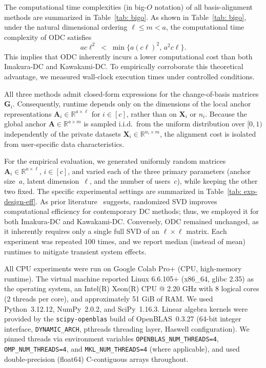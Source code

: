 \documentclass[final,3p,times]{elsarticle}
\theoremstyle{plain}
\newcommand{\matr}[1]{\bm{#1}}        %
\begin{document}
The computational time complexities (in big-\(O\) notation) of all basis-alignment methods are summarized in Table~\ref{tab: bigo}. As shown in Table~\ref{tab: bigo}, under the natural dimensional ordering \(\ell \le m < a\), the computational time complexity of ODC satisfies
\begin{equation}
    a c \ell^{2} \;<\; \min\{a(c\ell)^2,\, a^2 c \ell\}.
\end{equation}
This implies that ODC inherently incurs a lower computational cost than both Imakura-DC and Kawakami-DC. To empirically corroborate this theoretical advantage, we measured wall-clock execution times under controlled conditions.

All three methods admit closed-form expressions for the change-of-basis matrices $\matr{G}_i$. Consequently, runtime depends only on the dimensions of the local anchor representations $\matr{A}_i\in\mathbb{R}^{a\times \ell}$ for $i\in[c]$, rather than on $\matr{X}_i$ or $n_i$. Because the global anchor $\matr{A}\in\mathbb{R}^{a\times m}$ is sampled i.i.d.\ from the uniform distribution over $[0,1)$ independently of the private datasets $\matr{X}_i\in\mathbb{R}^{n_i\times m}$, the alignment cost is isolated from user-specific data characteristics.

For the empirical evaluation, we generated uniformly random matrices \(\matr{A}_i \in \mathbb{R}^{a \times \ell}\), \( i \in [c]\), and varied each of the three primary parameters (anchor size~\(a\), latent dimension~\(\ell\), and the number of users~\(c\)), while keeping the other two fixed. The specific experimental settings are summarized in Table~\ref{tab: exp-design-eff}. As prior literature~\cite{KawakamiDC} suggests, randomized SVD improves computational efficiency for contemporary DC methods; thus, we employed it for both Imakura-DC and Kawakami-DC. Conversely, ODC remained unchanged, as it inherently requires only a single full SVD of an \(\ell\times \ell\) matrix. Each experiment was repeated 100 times, and we report median (instead of mean) runtimes to mitigate transient system effects.

All CPU experiments were run on Google Colab Pro+ (CPU, high-memory runtime). The virtual machine reported Linux 6.6.105+ (x86\_64, glibc 2.35) as the operating system, an Intel(R) Xeon(R) CPU @ 2.20 GHz with 8 logical cores (2 threads per core), and approximately 51 GiB of RAM. We used Python~3.12.12, NumPy~2.0.2, and SciPy~1.16.3. Linear algebra kernels were provided by the \texttt{scipy-openblas} build of OpenBLAS~0.3.27 (64-bit integer interface, \texttt{DYNAMIC\_ARCH}, pthreads threading layer, Haswell configuration). We pinned threads via environment variables \texttt{OPENBLAS\_NUM\_THREADS=4}, \texttt{OMP\_NUM\_THREADS=4}, and \texttt{MKL\_NUM\_THREADS=4} (where applicable), and used double-precision (float64) C-contiguous arrays throughout.
\end{document}
